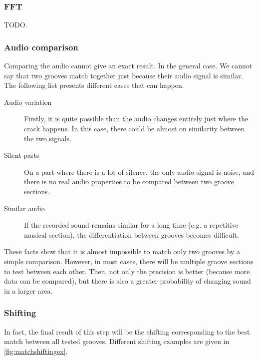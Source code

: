 \subsubsection{FFT}

TODO.

\subsubsection{Audio comparison}

Comparing the audio cannot give an exact result. In the general case. We cannot say that two grooves match together just because their audio signal is similar. The following list presents different cases that can happen.

\begin{description}
\item[Audio variation] Firstly, it is quite possible than the audio changes entirely just where the crack happens. In this case, there could be almost on similarity between the two signals.
\item[Silent parts] On a part where there is a lot of silence, the only audio signal is noise, and there is no real audio properties to be compared between two groove sections.
\item[Similar audio] If the recorded sound remains similar for a long time (e.g. a repetitive musical section), the differentiation between grooves becomes difficult.
\end{description}

These facts show that it is almost impossible to match only two grooves by a simple comparison. However, in most cases, there will be multiple groove sections to test between each other. Then, not only the precision is better (because more data can be compared), but there is also a greater probability of changing sound in a larger area.

\subsubsection{Shifting}

In fact, the final result of this step will be the shifting corresponding to the best match between all tested grooves. Different shifting examples are given in \autoref{fig:matchshiftingex}.


